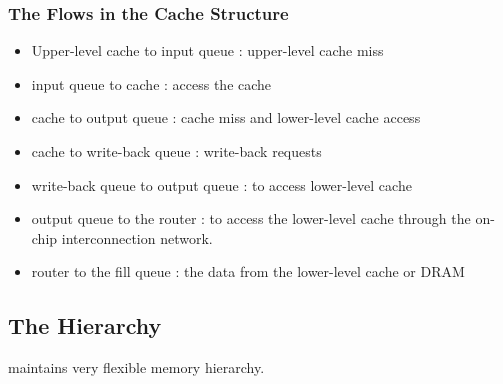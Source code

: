 \subsubsection{The Flows in the Cache Structure}
\label{sec:cache-flow}

\begin{itemize}

  \item Upper-level cache to input queue : upper-level cache miss

  \item input queue to cache : access the cache

  \item cache to output queue : cache miss and lower-level cache access

  \item cache to write-back queue : write-back requests

  \item write-back queue to output queue : to access lower-level cache

  \item output queue to the router : to access the lower-level cache
  through the on-chip interconnection network.

  \item router to the fill queue : the data from the lower-level cache
  or DRAM

\end{itemize}


\subsection{The Hierarchy}

\SIM maintains very flexible memory hierarchy.

